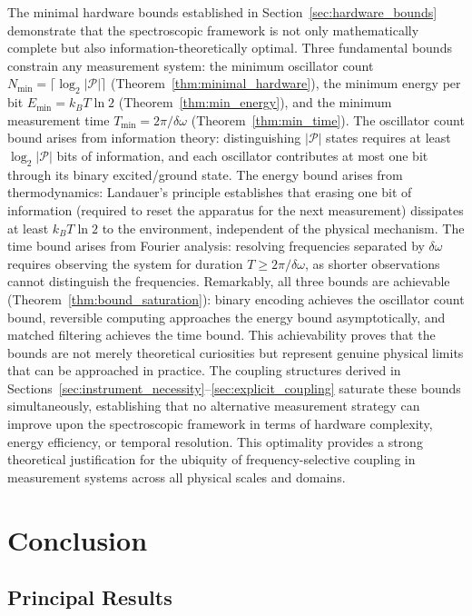 \documentclass[twocolumn,10pt,a4paper]{article}
\theoremstyle{remark}
\newcommand{\partition}{\mathcal{P}}
\begin{document}
The minimal hardware bounds established in Section~\ref{sec:hardware_bounds} demonstrate that the spectroscopic framework is not only mathematically complete but also information-theoretically optimal. Three fundamental bounds constrain any measurement system: the minimum oscillator count $N_{\min} = \lceil \log_2 |\partition| \rceil$ (Theorem~\ref{thm:minimal_hardware}), the minimum energy per bit $E_{\min} = k_B T \ln 2$ (Theorem~\ref{thm:min_energy}), and the minimum measurement time $T_{\min} = 2\pi/\delta\omega$ (Theorem~\ref{thm:min_time}). The oscillator count bound arises from information theory: distinguishing $|\partition|$ states requires at least $\log_2 |\partition|$ bits of information, and each oscillator contributes at most one bit through its binary excited/ground state. The energy bound arises from thermodynamics: Landauer's principle establishes that erasing one bit of information (required to reset the apparatus for the next measurement) dissipates at least $k_B T \ln 2$ to the environment, independent of the physical mechanism. The time bound arises from Fourier analysis: resolving frequencies separated by $\delta\omega$ requires observing the system for duration $T \geq 2\pi/\delta\omega$, as shorter observations cannot distinguish the frequencies. Remarkably, all three bounds are achievable (Theorem~\ref{thm:bound_saturation}): binary encoding achieves the oscillator count bound, reversible computing approaches the energy bound asymptotically, and matched filtering achieves the time bound. This achievability proves that the bounds are not merely theoretical curiosities but represent genuine physical limits that can be approached in practice. The coupling structures derived in Sections~\ref{sec:instrument_necessity}--\ref{sec:explicit_coupling} saturate these bounds simultaneously, establishing that no alternative measurement strategy can improve upon the spectroscopic framework in terms of hardware complexity, energy efficiency, or temporal resolution. This optimality provides a strong theoretical justification for the ubiquity of frequency-selective coupling in measurement systems across all physical scales and domains.

\section{Conclusion}
\label{sec:conclusion}

\subsection{Principal Results}
\end{document}
